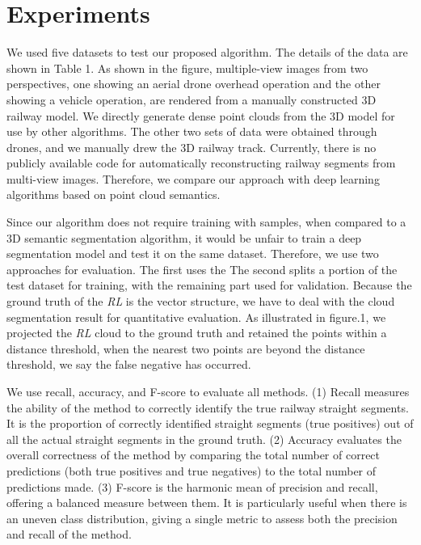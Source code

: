 \section{Experiments}
We used five datasets to test our proposed algorithm.
The details of the data are shown in Table 1.
As shown in the figure, 
multiple-view images from two perspectives, 
one showing an aerial drone overhead operation and the other showing a vehicle operation, 
are rendered from a manually constructed 3D railway model.
We directly generate dense point clouds from the 3D model for use by other algorithms.
The other two sets of data were obtained through drones, 
and we manually drew the 3D railway track.
Currently, 
there is no publicly available code for automatically reconstructing railway segments from multi-view images. Therefore, 
we compare our approach with deep learning algorithms based on point cloud semantics.

Since our algorithm does not require training with samples,  
when compared to a 3D semantic segmentation algorithm,
it would be unfair to train a deep segmentation model and test it on the same dataset. 
Therefore, 
we use two approaches for evaluation. 
The first uses the  
The second splits a portion of the test dataset for training, 
with the remaining part used for validation.
Because the ground truth of the \textit{RL} is the vector structure,
we have to deal with the cloud segmentation result for quantitative evaluation.
As illustrated in figure.1, 
we projected the \textit{RL} cloud to the ground truth and retained the points within a distance threshold,
when the nearest two points are beyond the distance threshold, 
we say the false negative has occurred.

We use recall, accuracy, and F-score to evaluate all methods.
(1) Recall measures the ability of the method to correctly identify the true railway straight segments. 
It is the proportion of correctly identified straight segments (true positives) out of all the actual straight segments in the ground truth.
(2) Accuracy evaluates the overall correctness of the method by comparing the total number of correct predictions (both true positives and true negatives) to the total number of predictions made.
(3) F-score is the harmonic mean of precision and recall, offering a balanced measure between them. It is particularly useful when there is an uneven class distribution, giving a single metric to assess both the precision and recall of the method.


